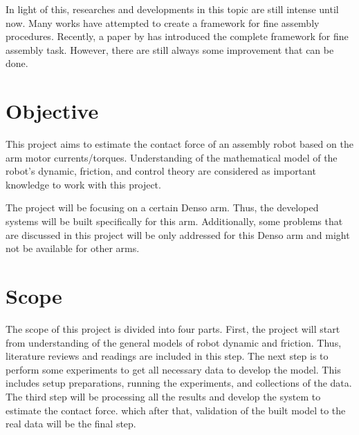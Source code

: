 In light of this, researches and developments in this topic are still intense until now. Many works have attempted to create a framework for fine assembly procedures. Recently, a paper by \cite{aaaa} has introduced the complete framework for fine assembly task. However, there are still always some improvement that can be done.

\section{Objective}


This project aims to estimate the contact force of an assembly robot based on the arm motor currents/torques. Understanding of the mathematical model of the robot’s dynamic, friction, and control theory are considered as important knowledge to work with this project.

The project will be focusing on a certain Denso arm. Thus, the developed systems will be built specifically for this arm. Additionally, some problems that are discussed in this project will be only addressed for this Denso arm and might not be available for other arms.


\section{Scope}


The scope of this project is divided into four parts. First, the project will start from understanding of the general models of robot dynamic and friction. Thus, literature reviews and readings are included in this step. The next step is to perform some experiments to get all necessary data to develop the model. This includes setup preparations, running the experiments, and collections of the data. The third step will be processing all the results and develop the system to estimate the contact force. which after that, validation of the built model to the real data will be the final step.
